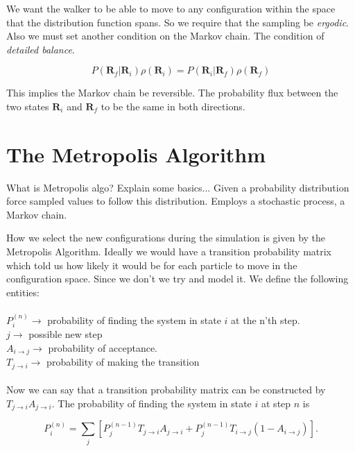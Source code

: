 We want the walker to be able to move to any configuration within the space that the distribution function spans. So we require that the sampling be \textit{ergodic}. Also we must set another condition on the Markov chain. The condition of \textit{detailed balance}. 

\begin{equation}
P(\mathbf{R}_f|\mathbf{R}_i) \rho(\mathbf{R}_i) = P(\mathbf{R}_i|\mathbf{R}_f) \rho(\mathbf{R}_f)
\end{equation}

This implies the Markov chain be reversible. The probability flux between the two states $\mathbf{R}_i$ and $\mathbf{R}_f$ to be the same in both directions. \cite{toulouse2016introduction}



\section{The Metropolis Algorithm}

What is Metropolis algo? Explain some basics...
Given a probability distribution force sampled values to follow this distribution. Employs a stochastic process, a Markov chain.

How we select the new configurations during the simulation is given by the Metropolis Algorithm. 
Ideally we would have a transition probability matrix which told us how likely it would be for each particle to move in the configuration space. Since we don't we try and model it.
We define the following entities:
\\
\\
$P_i^{(n)} \rightarrow$ probability of finding the system in state $i$ at the n'th step.
\\
$j \rightarrow$ possible new step
\\
$A_{i \rightarrow j} \rightarrow$ probability of acceptance. 
\\
$T_{j \rightarrow i} \rightarrow$ probability of making the transition  
\\
\\
Now we can say that a transition probability matrix can be constructed by $T_{j \rightarrow i}A_{j \rightarrow i}.$ The probability of finding the system in state $i$ at step $n$ is

\begin{equation}\label{eq:prob}
P_i^{(n)} = \sum_j \left[P_j^{(n-1)} T_{j \rightarrow i}A_{j \rightarrow i} + P_j^{(n-1)}T_{i \rightarrow j}(1 - A_{i \rightarrow j})\right].
\end{equation}

